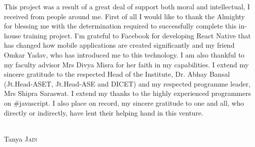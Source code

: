 \begin{acknowledgements}

This project was a result of a great deal of support both moral and intellectual, I received from people around me. First of all I would like to thank the Almighty for blessing me with the determination required to successfully complete this in-house training project. I'm grateful to Facebook for developing React Native that has changed how mobile applications are created significantly and my friend Omkar Yadav, who has introduced me to this technology. I am also thankful to my faculty advisor Mrs Divya Misra for her faith in my capabilities. I extend my sincere gratitude to the respected Head of the Institute, Dr. Abhay Bansal (Jt.Head-ASET, Jt.Head-ASE and DICET) and my respected programme leader, Mrs Shipra Saraswat. I extend my thanks to the highly experienced programmers on \#javascript. I also place on record, my sincere gratitude to one and all, who directly or indirectly, have lent their helping hand in this venture.

\begin{flushright}
  \textsc{}\\[1.0cm]
  Tanya \textsc{Jain}
\end{flushright}

\end{acknowledgements}